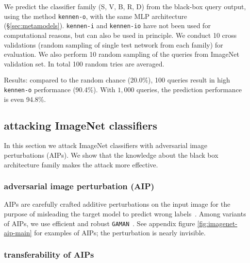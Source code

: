 \documentclass{article} %
\newcommand{\OR}{\texttt{kennen-o}\xspace}
\newcommand{\IC}{\texttt{kennen-i}\xspace}
\newcommand{\ORIC}{\texttt{kennen-io}\xspace}
\begin{document}
We predict the classifier family (S, V, B, R, D) from the black-box query output, using the method \OR, with the same MLP architecture (\S\ref{sec:metamodels}). \IC and \ORIC have not been used for computational reasons, but can also be used in principle. We conduct 10 cross validations (random sampling of single test network from each family) for evaluation. We also perform 10 random sampling of the queries from ImageNet validation set. In total 100 random tries are averaged.
 
Results: compared to the random chance (20.0\%), 100 queries result in high \OR performance (90.4\%). With $1,000$ queries, the prediction performance is even 94.8\%.

\subsection{attacking ImageNet classifiers}

In this section we attack ImageNet classifiers with adversarial image perturbations (AIPs). We show that the knowledge about the black box architecture family makes the attack more effective.

\subsubsection*{adversarial image perturbation (AIP)}

AIPs are carefully crafted additive perturbations on the input image for the purpose of misleading the target model to predict wrong labels~\citep{goodfellow2015iclr}. Among variants of AIPs, we use efficient and robust \texttt{GAMAN}~\citep{joon2017iccv}. See appendix figure \ref{fig:imagenet-aip-main} for examples of AIPs; the perturbation is nearly invisible. 

\subsubsection*{transferability of AIPs}
\end{document}
